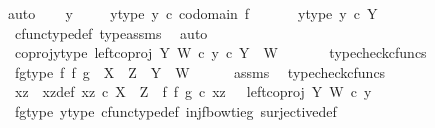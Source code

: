 \begin{isabellebody}
\isamarkupfalse%
{\isacharparenleft}{\kern0pt}auto{\isacharparenright}{\kern0pt}\isanewline
\ \ \isamarkupfalse%
\ y\ \isanewline
\ \ \isamarkupfalse%
\ y{\isacharunderscore}{\kern0pt}type{\isacharcolon}{\kern0pt}\ {\isachardoublequoteopen}y\ {\isasymin}\isactrlsub c\ codomain\ f{\isachardoublequoteclose}\ \isanewline
\ \ \isamarkupfalse%
\ \isamarkupfalse%
\ y{\isacharunderscore}{\kern0pt}type{}{\isacharcolon}{\kern0pt}\ {\isachardoublequoteopen}y\ {\isasymin}\isactrlsub c\ Y{\isachardoublequoteclose}\isanewline
\ \ \ \ \isamarkupfalse%
\ cfunc{\isacharunderscore}{\kern0pt}type{\isacharunderscore}{\kern0pt}def\ type{\isacharunderscore}{\kern0pt}assms{\isacharparenleft}{\kern0pt}{}{\isacharparenright}{\kern0pt}\ \isamarkupfalse%
\ auto\isanewline
\ \ \isamarkupfalse%
\ \isamarkupfalse%
\ coproj{\isacharunderscore}{\kern0pt}y{\isacharunderscore}{\kern0pt}type{\isacharcolon}{\kern0pt}\ {\isachardoublequoteopen}left{\isacharunderscore}{\kern0pt}coproj\ Y\ W\ {\isasymcirc}\isactrlsub c\ y\ {\isasymin}\isactrlsub c\ Y\ {\isasymCoprod}\ W{\isachardoublequoteclose}\ \isanewline
\ \ \ \ \isamarkupfalse%
\ typecheck{\isacharunderscore}{\kern0pt}cfuncs\isanewline
\ \ \isamarkupfalse%
\ fg{\isacharunderscore}{\kern0pt}type{\isacharcolon}{\kern0pt}\ {\isachardoublequoteopen}{\isacharparenleft}{\kern0pt}f\ {\isasymbowtie}\isactrlsub f\ g{\isacharparenright}{\kern0pt}\ {\isacharcolon}{\kern0pt}\ X\ {\isasymCoprod}\ Z\ {\isasymrightarrow}\ Y\ {\isasymCoprod}\ W{\isachardoublequoteclose}\isanewline
\ \ \ \ \isamarkupfalse%
\ assms\ \isamarkupfalse%
\ typecheck{\isacharunderscore}{\kern0pt}cfuncs\isanewline
\ \ \isamarkupfalse%
\ xz\ \ xz{\isacharunderscore}{\kern0pt}def{\isacharcolon}{\kern0pt}\ {\isachardoublequoteopen}xz\ {\isasymin}\isactrlsub c\ X\ {\isasymCoprod}\ Z\ {\isasymand}\ {\isacharparenleft}{\kern0pt}f\ {\isasymbowtie}\isactrlsub f\ g{\isacharparenright}{\kern0pt}\ {\isasymcirc}\isactrlsub c\ xz\ {\isacharequal}{\kern0pt}\ \ left{\isacharunderscore}{\kern0pt}coproj\ Y\ W\ {\isasymcirc}\isactrlsub c\ y{\isachardoublequoteclose}\isanewline
\ \ \ \ \isamarkupfalse%
\ fg{\isacharunderscore}{\kern0pt}type\ y{\isacharunderscore}{\kern0pt}type{}\ cfunc{\isacharunderscore}{\kern0pt}type{\isacharunderscore}{\kern0pt}def\ inj{\isacharunderscore}{\kern0pt}f{\isacharunderscore}{\kern0pt}bowtie{\isacharunderscore}{\kern0pt}g\ surjective{\isacharunderscore}{\kern0pt}def\ \isamarkupfalse%

\end{isabellebody}
